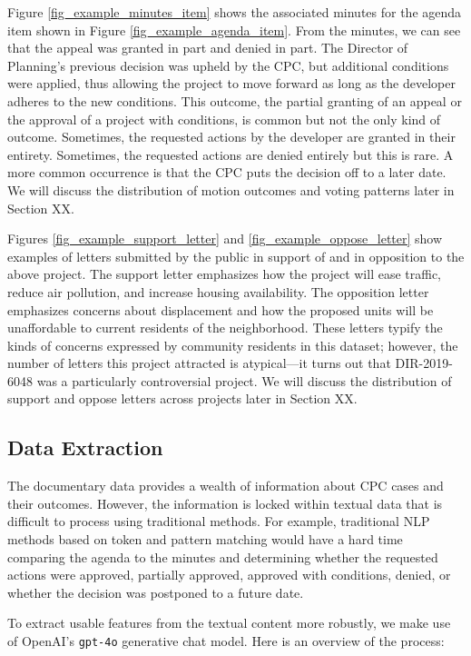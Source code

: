 Figure \ref{fig_example_minutes_item} shows the associated minutes for the agenda item shown in Figure \ref{fig_example_agenda_item}. From the minutes, we can see that the appeal was granted in part and denied in part. The Director of Planning's previous decision was upheld by the CPC, but additional conditions were applied, thus allowing the project to move forward as long as the developer adheres to the new conditions. This outcome, the partial granting of an appeal or the approval of a project with conditions, is common but not the only kind of outcome. Sometimes, the requested actions by the developer are granted in their entirety. Sometimes, the requested actions are denied entirely but this is rare. A more common occurrence is that the CPC puts the decision off to a later date. We will discuss the distribution of motion outcomes and voting patterns later in Section XX.

Figures \ref{fig_example_support_letter} and \ref{fig_example_oppose_letter} show examples of letters submitted by the public in support of and in opposition to the above project. The support letter emphasizes how the project will ease traffic, reduce air pollution, and increase housing availability. The opposition letter emphasizes concerns about displacement and how the proposed units will be unaffordable to current residents of the neighborhood. These letters typify the kinds of concerns expressed by community residents in this dataset; however, the number of letters this project attracted is atypical---it turns out that DIR-2019-6048 was a particularly controversial project. We will discuss the distribution of support and oppose letters across projects later in Section XX.

\subsection{Data Extraction}

The documentary data provides a wealth of information about CPC cases and their outcomes. However, the information is locked within textual data that is difficult to process using traditional methods. For example, traditional NLP methods based on token and pattern matching would have a hard time comparing the agenda to the minutes and determining whether the requested actions were approved, partially approved, approved with conditions, denied, or whether the decision was postponed to a future date. 

To extract usable features from the textual content more robustly, we make use of OpenAI's \texttt{gpt-4o} generative chat model. Here is an overview of the process:

